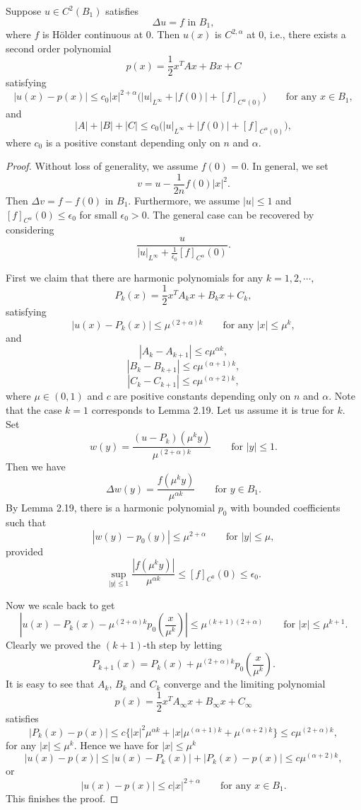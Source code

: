 \begin{theorem}\label{hanlin:maxprin-theorem-2-20}
Suppose $u \in C^2(B_1)$ satisfies
\[
\Delta u = f \text{ in } B_1,
\]
where $f$ is H\"older continuous at $0$. Then $u(x)$ is $C^{2,\alpha}$ at $0$, i.e., there exists a second order polynomial
\[
p(x)=\frac12 x^T A x + Bx + C
\]
satisfying
\[
|u(x)-p(x)| \le c_0|x|^{2+\alpha}\bigl(|u|_{L^\infty} + |f(0)| + [f]_{C^\alpha(0)}\bigr) \qquad \text{for any } x \in B_1,
\]
and
\[
|A| + |B| + |C| \le c_0\bigl(|u|_{L^\infty} + |f(0)| + [f]_{C^\alpha(0)}\bigr),
\]
where $c_0$ is a positive constant depending only on $n$ and $\alpha$.
\end{theorem}
\begin{proof}
\sketch
Without loss of generality, we assume $f(0)=0$. In general, we set
\[
v=u-\frac{1}{2n}f(0)|x|^2.
\]
Then $\Delta v=f-f(0)$ in $B_1$. Furthermore, we assume $|u|\le 1$ and
$[f]_{C^\alpha}(0)\le \epsilon_0$ for small $\epsilon_0>0$. The general case can be recovered by considering
\[
\frac{u}{|u|_{L^\infty}+\frac{1}{\epsilon_0}[f]_{C^\alpha}(0)}.
\]

First we claim that there are harmonic polynomials for any $k=1,2,\cdots,$
\[
P_k(x)=\frac{1}{2}x^T A_k x+B_k x+C_k,
\]
satisfying
\[
|u(x)-P_k(x)|\le \mu^{(2+\alpha)k}\qquad \text{for any } |x|\le \mu^k,
\]
and
\[
|A_k-A_{k+1}|\le c\mu^{\alpha k},
\]
\[
|B_k-B_{k+1}|\le c\mu^{(\alpha+1)k},
\]
\[
|C_k-C_{k+1}|\le c\mu^{(\alpha+2)k},
\]
where $\mu\in(0,1)$ and $c$ are positive constants depending only on $n$ and $\alpha$.
Note that the case $k=1$ corresponds to Lemma 2.19. Let us assume it is true
for $k$. Set
\[
w(y)=\frac{(u-P_k)(\mu^k y)}{\mu^{(2+\alpha)k}}\qquad \text{for } |y|\le 1.
\]
Then we have
\[
\Delta w(y)=\frac{f(\mu^k y)}{\mu^{\alpha k}}\qquad \text{for } y\in B_1.
\]
By Lemma 2.19, there is a harmonic polynomial $p_0$ with bounded coefficients such
that
\[
|w(y)-p_0(y)|\le \mu^{2+\alpha}\qquad \text{for } |y|\le \mu,
\]
provided
\[
\sup_{|y|\le 1}\frac{|f(\mu^k y)|}{\mu^{\alpha k}}\le [f]_{C^0}(0)\le \epsilon_0.
\]

Now we scale back to get
\[
|u(x)-P_k(x)-\mu^{(2+\alpha)k}p_0\!\left(\frac{x}{\mu^k}\right)|\le \mu^{(k+1)(2+\alpha)}\qquad \text{for } |x|\le \mu^{k+1}.
\]
Clearly we proved the $(k+1)$-th step by letting
\[
P_{k+1}(x)=P_k(x)+\mu^{(2+\alpha)k}p_0\!\left(\frac{x}{\mu^k}\right).
\]
It is easy to see that $A_k$, $B_k$ and $C_k$ converge and the limiting polynomial
\[
p(x)=\frac{1}{2}x^T A_\infty x+B_\infty x+C_\infty
\]
satisfies
\[
|P_k(x)-p(x)|\le c\{ |x|^2\mu^{\alpha k}+|x|\mu^{(\alpha+1)k}+\mu^{(\alpha+2)k}\}\le c\mu^{(2+\alpha)k},
\]
for any $|x|\le \mu^k$. Hence we have for $|x|\le \mu^k$
\[
|u(x)-p(x)|\le |u(x)-P_k(x)|+|P_k(x)-p(x)|\le c\mu^{(\alpha+2)k},
\]
or
\[
\lvert u(x)-p(x)\rvert\le c\lvert x\rvert^{2+\alpha}\qquad \text{for any }x\in B_1.
\]
This finishes the proof.
\end{proof}

